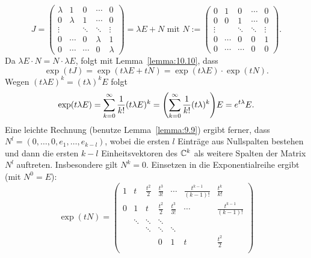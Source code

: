 \begin{anwendung}
	\[
	J = \begin{pmatrix}
	\lambda & 1       & 0      & \cdots  & 0       \\
	0       & \lambda & 1      & \cdots  & 0       \\
	\vdots  &         & \ddots & \ddots  & \vdots  \\
	0       & \cdots  & 0      & \lambda & 1       \\
	0       & \cdots  & \cdots & 0       & \lambda
	\end{pmatrix} = \lambda E + N \text{ mit } N:=
	\begin{pmatrix}
	0      & 1      & 0      & \cdots & 0      \\
	0      & 0      & 1      & \cdots & 0      \\
	\vdots &        & \ddots & \ddots & \vdots \\
	0      & \cdots & 0      & 0      & 1      \\
	0      & \cdots & \cdots & 0      & 0
	\end{pmatrix}.
	\]
	Da $\lambda E \cdot N = N \cdot \lambda E$, folgt mit Lemma~\ref{lemma:10.10}, dass
	\[
	\exp(tJ) = \exp(t\lambda E + tN) = \exp(t \lambda E) \cdot \exp(tN).
	\]
	Wegen $(t\lambda E)^{k} = (t\lambda)^{k}E$ folgt
	\[
	\exp(t\lambda E) = \sum_{k=0}^{\infty} \frac{1}{k!} (t \lambda E)^{k} = \enb{\sum_{k=0}^{\infty} \frac{1}{k!} (t\lambda)^{k}} E = e^{t\lambda} E.
	\]
	Eine leichte Rechnung (benutze Lemma~\ref{lemma:9.9}) ergibt ferner, dass $N^{l} = (0, \dots, 0,e_1,\dots,e_{k-l})$, wobei die ersten $l$ Einträge aus Nullspalten bestehen und dann die ersten $k-l$ Einheitsvektoren des $\mathbb{C}^{k}$ als weitere Spalten der Matrix $N^{l}$ auftreten.
	Insbesondere gilt $N^{k} = 0$.
	Einsetzen in die Exponentialreihe ergibt (mit $N^0 = E$):
	\[
	\exp(tN) =
	\begin{pmatrix}
	1 & t      & \frac{t^2}{2} & \frac{t^3}{3!} & \cdots         & \frac{t^{k-1}}{(k-1)!} & \frac{t^{k}}{k!}       \\
	0 & 1      & t             & \frac{t^2}{2}  & \frac{t^3}{3!} & \cdots                 & \frac{t^{k-1}}{(k-1)!} \\
	& \ddots & \ddots        & \ddots         &                &                        &  \\
	&        & \ddots        & \ddots         & \ddots         &                        &  \\
	&        &               & 0              & 1              & t                      & \frac{t^2}{2}          \\

\end{pmatrix}\]
\end{anwendung}
